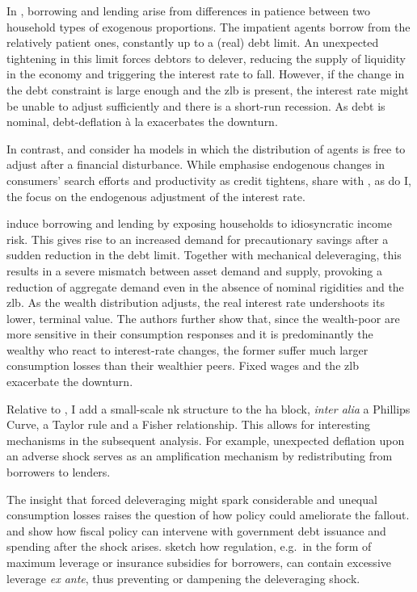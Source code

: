\documentclass[a4paper,12pt]{article} %
\numberwithin{equation}{section} %
\numberwithin{figure}{section}
\numberwithin{table}{section}
\begin{document}
In \textcite{egg2012}, borrowing and lending arise from differences in patience between two household types of exogenous proportions. The impatient agents borrow from the relatively patient ones, constantly up to a (real) debt limit. An unexpected tightening in this limit forces debtors to delever, reducing the supply of liquidity in the economy and triggering the interest rate to fall. However, if the change in the debt constraint is large enough and the \Gls{zlb} is present, the interest rate might be unable to adjust sufficiently and there is a short-run recession. As debt is nominal, debt-deflation à la \textcite{fisher1933} exacerbates the downturn.

In contrast, \textcite{riosrull2015} and \textcite{gl2017} consider \Gls{ha} models in which the distribution of agents is free to adjust after a financial disturbance. While \textcite{riosrull2015} emphasise endogenous changes in consumers' search efforts and productivity as credit tightens, \textcite{gl2017} share with \textcite{egg2012}, as do I, the focus on the endogenous adjustment of the interest rate.

\textcite{gl2017} induce borrowing and lending by exposing households to idiosyncratic income risk. This gives rise to an increased demand for precautionary savings after a sudden reduction in the debt limit. Together with mechanical deleveraging, this results in a severe mismatch between asset demand and supply, provoking a reduction of aggregate demand even in the absence of nominal rigidities and the \Gls{zlb}. As the wealth distribution adjusts, the real interest rate undershoots its lower, terminal value. The authors further show that, since the wealth-poor are more sensitive in their consumption responses and it is predominantly the wealthy who react to interest-rate changes, the former suffer much larger consumption losses than their wealthier peers. Fixed wages and the \Gls{zlb} exacerbate the downturn. 

Relative to \textcite{gl2017}, I add a small-scale \Gls{nk} structure to the \Gls{ha} block, \textit{inter alia} a Phillips Curve, a Taylor rule and a Fisher relationship. This allows for interesting mechanisms in the subsequent analysis. For example, unexpected deflation upon an adverse shock serves as an amplification mechanism by redistributing from borrowers to lenders.

The insight that forced deleveraging might spark considerable and unequal consumption losses raises the question of how policy could ameliorate the fallout. \textcite{egg2012} and \textcite{gl2017} show how fiscal policy can intervene with government debt issuance and spending after the shock arises. \textcite{korinek2016} sketch how regulation, e.g.~in the form of maximum leverage or insurance subsidies for borrowers, can contain excessive leverage \textit{ex ante}, thus preventing or dampening the deleveraging shock.
\end{document}
